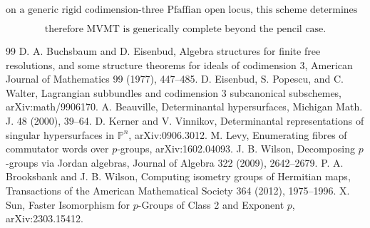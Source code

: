 \documentclass[11pt]{article}
\begin{document}
\[
\boxed{
\text{on a generic rigid codimension-three Pfaffian open locus, this scheme determines the tensor;}
}
\]

\[
\boxed{
\text{therefore MVMT is generically complete beyond the pencil case.}
}
\]

\begin{thebibliography}{99}
 D. A. Buchsbaum and D. Eisenbud, Algebra structures for finite free resolutions, and some structure theorems for ideals of codimension 3, American Journal of Mathematics 99 (1977), 447--485.
 D. Eisenbud, S. Popescu, and C. Walter, Lagrangian subbundles and codimension 3 subcanonical subschemes, arXiv:math/9906170.
 A. Beauville, Determinantal hypersurfaces, Michigan Math. J. 48 (2000), 39--64.
 D. Kerner and V. Vinnikov, Determinantal representations of singular hypersurfaces in $\mathbb P^n$, arXiv:0906.3012.
 M. Levy, Enumerating fibres of commutator words over $p$-groups, arXiv:1602.04093.
 J. B. Wilson, Decomposing $p$-groups via Jordan algebras, Journal of Algebra 322 (2009), 2642--2679.
 P. A. Brooksbank and J. B. Wilson, Computing isometry groups of Hermitian maps, Transactions of the American Mathematical Society 364 (2012), 1975--1996.
 X. Sun, Faster Isomorphism for $p$-Groups of Class 2 and Exponent $p$, arXiv:2303.15412.
\end{thebibliography}
\end{document}

